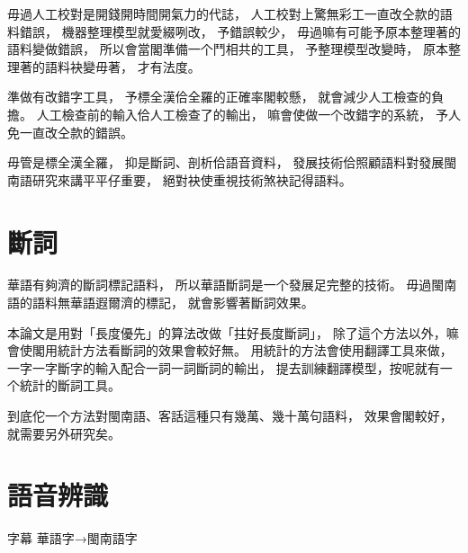

毋過人工校對是開錢開時間開氣力的代誌，
人工校對上驚無彩工一直改仝款的語料錯誤，
機器整理模型就愛綴咧改，
予錯誤較少，
毋過嘛有可能予原本整理著的語料變做錯誤，
所以會當閣準備一个鬥相共的工具，
予整理模型改變時，
原本整理著的語料袂變毋著，
才有法度。

準做有改錯字工具，
予標全漢佮全羅的正確率閣較懸，
就會減少人工檢查的負擔。
人工檢查前的輸入佮人工檢查了的輸出，
嘛會使做一个改錯字的系統，
予人免一直改仝款的錯誤。

毋管是標全漢全羅，
抑是斷詞、剖析佮語音資料，
發展技術佮照顧語料對發展閩南語研究來講平平仔重要，
絕對袂使重視技術煞袂記得語料。


\section{斷詞}
\label{節：未來斷詞}

華語有夠濟的斷詞標記語料，
所以華語斷詞是一个發展足完整的技術。
毋過閩南語的語料無華語遐爾濟的標記，
就會影響著斷詞效果。

本論文是用對「長度優先」的算法改做「拄好長度斷詞」，
除了這个方法以外，嘛會使閣用統計方法看斷詞的效果會較好無。
用統計的方法會使用翻譯工具來做，
一字一字斷字的輸入配合一詞一詞斷詞的輸出，
提去訓練翻譯模型，按呢就有一个統計的斷詞工具。

到底佗一个方法對閩南語、客話這種只有幾萬、幾十萬句語料，
效果會閣較好，
就需要另外研究矣。


\section{語音辨識}
\label{節：未來辨識}
字幕 華語字→閩南語字